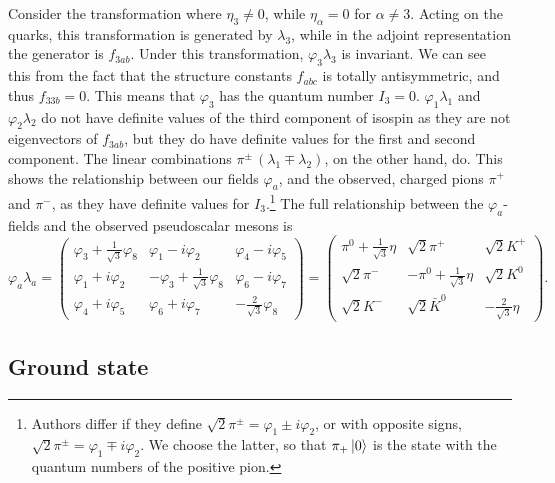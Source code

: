 Consider the transformation where $\eta_3 \neq 0$, while $\eta_\alpha = 0$ for $\alpha \neq 3$.
Acting on the quarks, this transformation is generated by $\lambda_3$, while in the adjoint representation the generator is $f_{3ab}$.
Under this transformation,  $\varphi_3\lambda_3$ is invariant.
We can see this from the fact that the structure constants $f_{abc}$ is totally antisymmetric, and thus $f_{33b} = 0$.
This means that $\varphi_3$ has the quantum number $I_3 = 0$.
$\varphi_1\lambda_1$ and $\varphi_2\lambda_2$ do not have definite values of the third component of isospin as they are not eigenvectors of $f_{3ab}$, but they do have definite values for the first and second component.
The linear combinations $\pi^\pm \, (\lambda_1 \mp \lambda_2)$, on the other hand, do.
This shows the relationship between our fields $\varphi_a$, and the observed, charged pions $\pi^+$ and $\pi^-$, as they have definite values for $I_3$.\footnote{
    Authors differ if they define $\sqrt 2 \pi^\pm = \varphi_1 \pm i \varphi_2$, or with opposite signs, $\sqrt 2 \pi^\pm = \varphi_1 \mp i \varphi_2$.  We choose the latter, so that $\pi_+ \ket{0}$ is the state with the quantum numbers of the positive pion.
    }
The full relationship between the $\varphi_a$-fields  and the observed pseudoscalar mesons is~\autocite{schererIntroductionChiralPerturbation2002}
%
\begin{equation}
    \varphi_a \lambda_a
    =
    \begin{pmatrix}
        \varphi_3 + \frac{1}{\sqrt{3}} \varphi_8 & \varphi_1 - i \varphi_2 & \varphi_4 - i \varphi_5 \\
        \varphi_1 + i \varphi_2 & - \varphi_3 + \frac{1}{\sqrt{3}} \varphi_8 & \varphi_6 - i \varphi_7  \\
        \varphi_4 + i \varphi_5 & \varphi_6 + i \varphi_7  & - \frac{2}{\sqrt{3}} \varphi_8
    \end{pmatrix}
    =
    \begin{pmatrix}
        \pi^0 + \frac{1}{\sqrt{3}}\eta & \sqrt{2}\pi^+ & \sqrt{2}K^+ \\
        \sqrt{2}\pi^- & -\pi^0 + \frac{1}{\sqrt{3}}\eta & \sqrt{2}K^0 \\
        \sqrt{2}K^- & \sqrt{2}\bar K^0  & - \frac{2}{\sqrt 3} \eta
    \end{pmatrix}.
\end{equation}




\subsection{Ground state}

